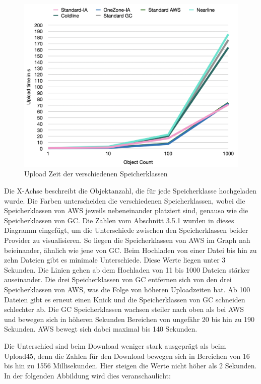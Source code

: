 \begin{figure}[h]
	\centering
	\includegraphics[width=14cm,keepaspectratio]{Pictures/UploadTime.png}
	\caption{Upload Zeit der verschiedenen Speicherklassen}
\end{figure}	

Die X-Achse beschreibt die Objektanzahl, die für jede Speicherklasse hochgeladen wurde. Die Farben unterscheiden die verschiedenen Speicherklassen, wobei die Speicherklassen von AWS jeweils nebeneinander platziert sind, genauso wie die Speicherklassen von GC. Die Zahlen vom Abschnitt 3.5.1 wurden in dieses Diagramm eingefügt, um die Unterschiede zwischen den Speicherklassen beider Provider zu visualisieren. So liegen die Speicherklassen von AWS im Graph nah beieinander, ähnlich wie jene von GC. Beim Hochladen von einer Datei bis hin zu zehn Dateien gibt es minimale Unterschiede. Diese Werte liegen unter 3 Sekunden. Die Linien gehen ab dem Hochladen von 11 bis 1000 Dateien stärker auseinander. Die drei Speicherklassen von GC entfernen sich von den drei Speicherklassen von AWS, was die Folge von höheren Uploadzeiten hat. Ab 100 Dateien gibt es erneut einen Knick und die Speicherklassen von GC schneiden schlechter ab. Die GC Speicherklassen wachsen steiler nach oben als bei AWS und bewegen sich in höheren Sekunden Bereichen von ungefähr 20 bis hin zu 190 Sekunden. AWS bewegt sich dabei maximal bis 140 Sekunden. 

\newpage

Die Unterschied sind beim Download weniger stark ausgeprägt als beim Upload45, denn die Zahlen für den Download bewegen sich in Bereichen von 16 bis hin zu 1556 Millisekunden. Hier steigen die Werte nicht höher als 2 Sekunden. In der folgenden Abbildung wird dies veranschaulicht:

